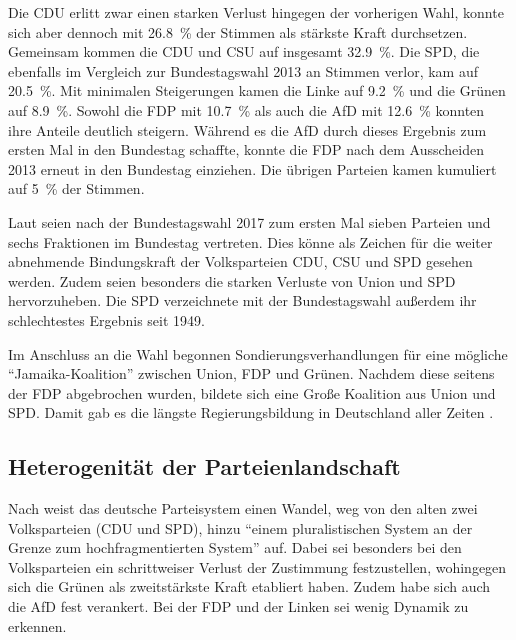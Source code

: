 Die \ac{CDU} erlitt zwar einen starken Verlust hingegen der vorherigen Wahl, konnte sich aber dennoch mit \SI{26.8}{\percent} der Stimmen als stärkste Kraft durchsetzen. Gemeinsam kommen die \ac{CDU} und \acs{CSU} auf insgesamt \SI{32.9}{\percent}. Die \ac{SPD}, die ebenfalls im Vergleich zur Bundestagswahl \num{2013} an Stimmen verlor, kam auf \SI{20.5}{\percent}. Mit minimalen Steigerungen kamen die Linke auf \SI{9.2}{\percent} und die Grünen auf \SI{8.9}{\percent}. Sowohl die \ac{FDP} mit \SI{10.7}{\percent} als auch die \ac{AfD} mit \SI{12.6}{\percent} konnten ihre Anteile deutlich steigern. Während es die \ac{AfD} durch dieses Ergebnis zum ersten Mal in den Bundestag schaffte, konnte die \ac{FDP} nach dem Ausscheiden \num{2013} erneut in den Bundestag einziehen. Die übrigen Parteien kamen kumuliert auf \SI{5}{\percent} der Stimmen.

Laut \textcite{schmid_deutscher_2021} seien nach der Bundestagswahl \num{2017} zum ersten Mal sieben Parteien und sechs Fraktionen im Bundestag vertreten. Dies könne als Zeichen für die weiter abnehmende Bindungskraft der Volksparteien \ac{CDU}, \ac{CSU} und \ac{SPD} gesehen werden. Zudem seien besonders die starken Verluste von Union und \ac{SPD} hervorzuheben. Die \ac{SPD} verzeichnete mit der Bundestagswahl außerdem ihr schlechtestes Ergebnis seit \num{1949}.

Im Anschluss an die Wahl begonnen Sondierungsverhandlungen für eine mögliche \enquote{Jamaika-Koalition} zwischen Union, \ac{FDP} und Grünen. Nachdem diese seitens der \ac{FDP} abgebrochen wurden, bildete sich eine Große Koalition aus Union und \ac{SPD}. Damit gab es die längste Regierungsbildung in Deutschland aller Zeiten \parencite{schmid_deutscher_2021}.

\subsection{Heterogenität der Parteienlandschaft} \label{subsec:heterogenitätParteien}

Nach \textcite{niedermayer_entwicklung_2020} weist das deutsche Parteisystem einen Wandel, weg von den alten zwei Volksparteien (\ac{CDU} und \ac{SPD}), hinzu \enquote{einem pluralistischen System an der Grenze zum hochfragmentierten System} auf. Dabei sei besonders bei den Volksparteien ein schrittweiser Verlust der Zustimmung festzustellen, wohingegen sich die Grünen als zweitstärkste Kraft etabliert haben. Zudem habe sich auch die \ac{AfD} fest verankert. Bei der \ac{FDP} und der Linken sei wenig Dynamik zu erkennen.

